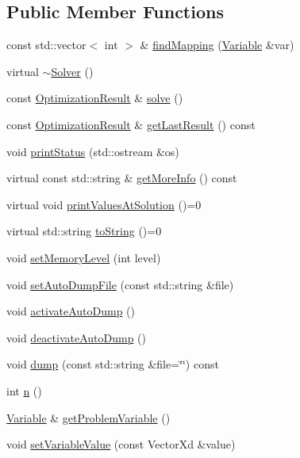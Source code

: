 \subsection*{Public Member Functions}
\begin{DoxyCompactItemize}
\item 
const std\+::vector$<$ int $>$ \& \hyperlink{classocra_1_1Solver_a67ee15c2dd55a5345f3872b35fca59cd}{find\+Mapping} (\hyperlink{classocra_1_1Variable}{Variable} \&var)
\item 
virtual \hyperlink{classocra_1_1Solver_a9919a7070eddaaeefda307a0d4bc0aa9}{$\sim$\+Solver} ()
\item 
const \hyperlink{structocra_1_1OptimizationResult}{Optimization\+Result} \& \hyperlink{classocra_1_1Solver_a86151fea09399da16d6ce47abb1ba904}{solve} ()
\item 
const \hyperlink{structocra_1_1OptimizationResult}{Optimization\+Result} \& \hyperlink{classocra_1_1Solver_a4d21fa5cd2e0ed8b9418556a0f0b1b92}{get\+Last\+Result} () const
\item 
void \hyperlink{classocra_1_1Solver_a6126d57ab3704acaec99525087ced070}{print\+Status} (std\+::ostream \&os)
\item 
virtual const std\+::string \& \hyperlink{classocra_1_1Solver_a3ebcf70ad5466cd31f27811ad6ccdfff}{get\+More\+Info} () const
\item 
virtual void \hyperlink{classocra_1_1Solver_ab1903098e25c16a9f92c36d37967e8fa}{print\+Values\+At\+Solution} ()=0
\item 
virtual std\+::string \hyperlink{classocra_1_1Solver_ab3783d1c208500bfb1daa3e1abf34146}{to\+String} ()=0
\item 
void \hyperlink{classocra_1_1Solver_a173cf07771133096beec4a7d5aefe00d}{set\+Memory\+Level} (int level)
\item 
void \hyperlink{classocra_1_1Solver_a913b2bf9a6d9f64c70ad1b5fbb09172f}{set\+Auto\+Dump\+File} (const std\+::string \&file)
\item 
void \hyperlink{classocra_1_1Solver_abe008748e898aff38d0c13c4c9edbe5a}{activate\+Auto\+Dump} ()
\item 
void \hyperlink{classocra_1_1Solver_a4b766c5ed75ce93245fecb64ae115adb}{deactivate\+Auto\+Dump} ()
\item 
void \hyperlink{classocra_1_1Solver_ad81e89280ad6157a8c2bdc715fc8c8b4}{dump} (const std\+::string \&file=\char`\"{}\char`\"{}) const
\item 
int \hyperlink{classocra_1_1Solver_a63e73904de66df69372ed91c6b9d058b}{n} ()
\item 
\hyperlink{classocra_1_1Variable}{Variable} \& \hyperlink{classocra_1_1Solver_ad80a950db015620c2eb43cbaab5ca51f}{get\+Problem\+Variable} ()
\item 
void \hyperlink{classocra_1_1Solver_ac67fe8faaf3355f3430b5fed881832fe}{set\+Variable\+Value} (const Vector\+Xd \&value)
\end{DoxyCompactItemize}
